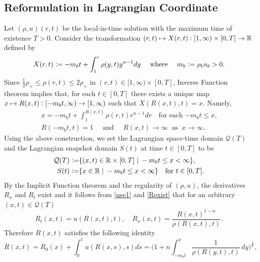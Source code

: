 \documentclass[a4paper,12pt,draft]{article}
\theoremstyle{remark}
\def\R{\mathbb{R}}
\def\mQ{\mathcal{Q}}
\newcommand{\qu}{\quad}
\begin{document}
\subsection{Reformulation in Lagrangian Coordinate}\label{ssec:reform}
Let $(\rho,u)(r,t)$ be the local-in-time solution with the maximum time of existence $T>0$. Consider the transformation $(r,t)\mapsto X(r,t)\vcentcolon [1,\infty)\times[0,T]\to \R$ defined by
\begin{equation}\label{RInv}
	X(r,t) \vcentcolon= -m_b t + \int_{1}^{r} \rho(y,t) y^{n-1} d y \quad \text{ where } \quad m_b\vcentcolon= \rho_b u_b>0.
\end{equation}
Since $\frac{1}{2}\rho_{+} \le \rho(r,t)\le 2\rho_+$ in $(r,t)\in[1,\infty)\times[0,T]$, Inverse Function theorem implies that, for each $t\in[0,T]$ there exists a unique map $x\mapsto R(x,t) \vcentcolon [-m_b t, \infty)\to [1,\infty)$ such that $X(R(x,t),t)=x$. Namely,
\begin{subequations}\label{Rexist}
\begin{gather}
    x= -m_b t + \int_{1}^{R(x,t)} \rho(r,t) r^{n-1} d r \quad \text{for each $-m_b t \le  x$,}\label{Rmass}\\
     R(-m_b t,t)=1 \quad \text{ and } \quad R(x,t)\to \infty \ \text{ as } \ x\to\infty.\label{Rbdry}
\end{gather} 
\end{subequations}
Using the above construction, we set the Lagrangian space-time domain $\mQ(T)$ and the Lagrangian snapshot domain $S(t)$ at time $t\in[0,T]$ to be
\begin{subequations}\label{Ldomain}
\begin{align}
\mQ(T)\vcentcolon=& \{ (x,t)\in\R\times[0,T] \;|\; -m_b t \le x < \infty \}, \label{lsp} \\
S(t) \vcentcolon=& \{ x\in\R \;|\; -m_b t \le x < \infty \} \qu \text{for $t\in[0,T]$.} \label{lt}
\end{align}
\end{subequations}
By the Implicit Function theorem and the regularity of $(\rho,u)$, the derivatives $R_x$ and $R_t$ exist and it follows from \eqref{nse1} and \eqref{Rexist} that for an arbitrary $(x,t)\in\mQ(T)$
\begin{equation}\label{Rdiff}
	R_t(x,t) = u(R(x,t),t), \qu R_x(x,t) = \dfrac{R(x,t)^{1-n}}{\rho(R(x,t),t)}.
\end{equation}
Therefore $R(x,t)$ satisfies the following identity
\begin{equation}\label{R}
R(x,t)= R_0(x) + \int_{0}^{t} u(R(x,s),s)d s = \Big(1+n\int_{-m_b t}^{x} \dfrac{1}{\rho(R(y,t),t)}\,d y\Big)^{\frac{1}{n}},
\end{equation} 
\end{document}
